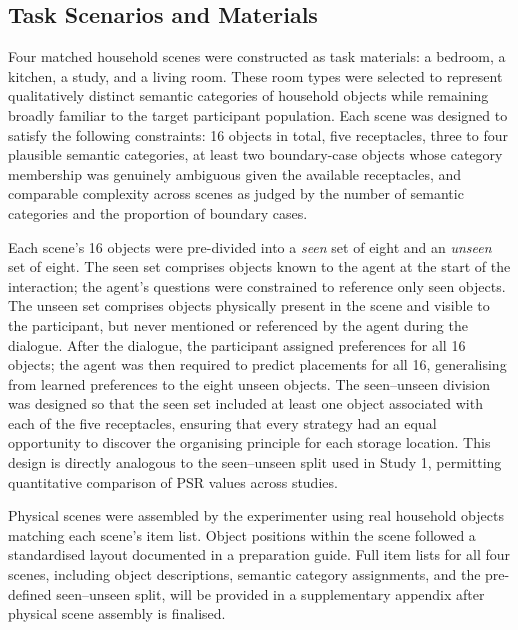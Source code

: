 \documentclass[manuscript,review,anonymous]{acmart}
\begin{document}

\subsection{Task Scenarios and Materials}
\label{sec:study2:tasks}

Four matched household scenes were constructed as task materials: a bedroom, a kitchen, a study, and a living room. These room types were selected to represent qualitatively distinct semantic categories of household objects while remaining broadly familiar to the target participant population. Each scene was designed to satisfy the following constraints: 16 objects in total, five receptacles, three to four plausible semantic categories, at least two boundary-case objects whose category membership was genuinely ambiguous given the available receptacles, and comparable complexity across scenes as judged by the number of semantic categories and the proportion of boundary cases.

Each scene's 16 objects were pre-divided into a \textit{seen} set of eight and an \textit{unseen} set of eight. The seen set comprises objects known to the agent at the start of the interaction; the agent's questions were constrained to reference only seen objects. The unseen set comprises objects physically present in the scene and visible to the participant, but never mentioned or referenced by the agent during the dialogue. After the dialogue, the participant assigned preferences for all 16 objects; the agent was then required to predict placements for all 16, generalising from learned preferences to the eight unseen objects. The seen--unseen division was designed so that the seen set included at least one object associated with each of the five receptacles, ensuring that every strategy had an equal opportunity to discover the organising principle for each storage location. This design is directly analogous to the seen--unseen split used in Study 1, permitting quantitative comparison of PSR values across studies.

Physical scenes were assembled by the experimenter using real household objects matching each scene's item list. Object positions within the scene followed a standardised layout documented in a preparation guide. Full item lists for all four scenes, including object descriptions, semantic category assignments, and the pre-defined seen--unseen split, will be provided in a supplementary appendix after physical scene assembly is finalised. %
\end{document}
